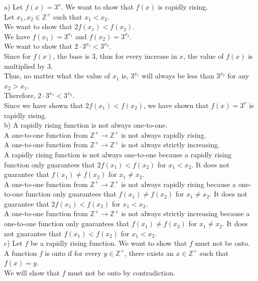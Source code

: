 \documentclass[12pt]{exam}
\begin{document}
\begin{solution}
  a) Let $f(x) = 3^x$. We want to show that $f(x)$ is rapidly rising.\\
  Let $x_1, x_2 \in \mathbb{Z}^+$ such that $x_1 < x_2$.\\
  We want to show that $2f(x_1) < f(x_2)$.\\
  We have $f(x_1) = 3^{x_1}$ and $f(x_2) = 3^{x_2}$.\\
  We want to show that $2\cdot 3^{x_1} < 3^{x_2}$.\\
  Since for $f(x)$, the base is 3, thus for every increase in $x$, the value of $f(x)$ is multiplied by 3.\\
  Thus, no matter what the value of $x_1$ is, $3^{x_1}$ will always be less than $3^{x_2}$ for any $x_2 > x_1$.\\
  Therefore, $2\cdot 3^{x_1} < 3^{x_2}$.\\
  Since we have shown that $2f(x_1) < f(x_2)$, we have shown that $f(x) = 3^x$ is rapidly rising.\\
  b) A rapidly rising function is not always one-to-one.\\
  A one-to-one function from $\mathbb{Z}^+\to\mathbb{Z}^+$ is not always rapidly rising.\\
  A one-to-one function from $\mathbb{Z}^+\to\mathbb{Z}^+$ is not always strictly increasing.\\
  A rapidly rising function is not always one-to-one because a rapidly rising function only guarantees that $2f(x_1) < f(x_2)$ for $x_1 < x_2$. It does not guarantee that $f(x_1) \neq f(x_2)$ for $x_1 \neq x_2$.\\
  A one-to-one function from $\mathbb{Z}^+\to\mathbb{Z}^+$ is not always rapidly rising because a one-to-one function only guarantees that $f(x_1) \neq f(x_2)$ for $x_1 \neq x_2$. It does not guarantee that $2f(x_1) < f(x_2)$ for $x_1 < x_2$.\\
  A one-to-one function from $\mathbb{Z}^+\to\mathbb{Z}^+$ is not always strictly increasing because a one-to-one function only guarantees that $f(x_1) \neq f(x_2)$ for $x_1 \neq x_2$. It does not guarantee that $f(x_1) < f(x_2)$ for $x_1 < x_2$.\\
  c) Let $f$ be a rapidly rising function. We want to show that $f$ must not be onto.\\
  A function $f$ is onto if for every $y\in\mathbb{Z}^+$, there exists an $x\in\mathbb{Z}^+$ such that $f(x) = y$.\\
  We will show that $f$ must not be onto by contradiction.\\

\end{solution}
\end{document}

